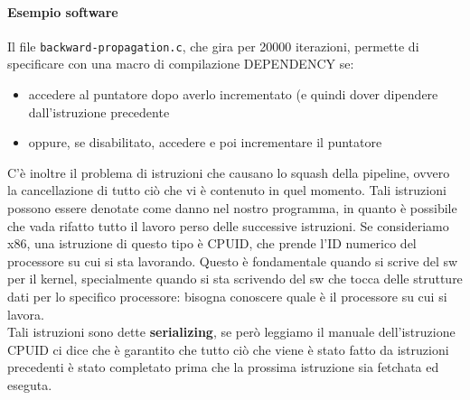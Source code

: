 \documentclass[12pt, oneside]{extbook}
\begin{document}
\paragraph*{Esempio software} Il file \texttt{backward-propagation.c}, che gira per 20000 iterazioni, permette di specificare con una macro di compilazione DEPENDENCY se:
\begin{itemize}
\item accedere al puntatore dopo averlo incrementato (e quindi dover dipendere dall'istruzione precedente
\item oppure, se disabilitato, accedere e poi incrementare il puntatore
\end{itemize}
C'è inoltre il problema di istruzioni che causano lo squash della pipeline, ovvero la cancellazione di tutto ciò che vi è contenuto in quel momento. Tali istruzioni possono essere denotate come danno nel nostro programma, in quanto è possibile che vada rifatto tutto il lavoro perso delle successive istruzioni. Se consideriamo x86, una istruzione di questo tipo è \textsf{CPUID}, che prende l'ID numerico del processore su cui si sta lavorando. Questo è fondamentale quando si scrive del sw per il kernel, specialmente quando si sta scrivendo del sw che tocca delle strutture dati per lo specifico processore: bisogna conoscere quale è il processore su cui si lavora.\\ Tali istruzioni sono dette \textbf{serializing}, se però leggiamo il manuale dell'istruzione CPUID ci dice che è garantito che tutto ciò che viene è stato fatto da istruzioni precedenti è stato completato prima che la prossima istruzione sia fetchata ed eseguta.
\end{document}
